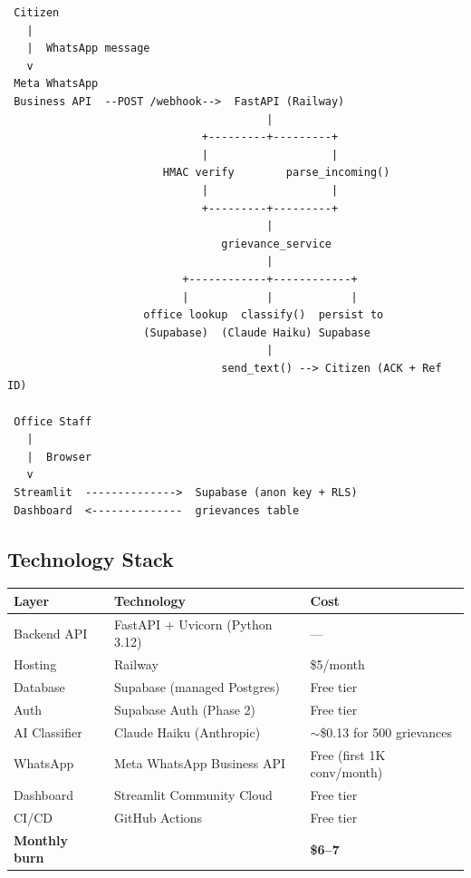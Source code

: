\documentclass[11pt, a4paper]{article}
\begin{document}
\begin{center}
\begin{tcolorbox}[colback=lightgray, colframe=pollityblue, sharp corners, width=\linewidth]
\footnotesize\ttfamily
\begin{verbatim}
 Citizen
   |
   |  WhatsApp message
   v
 Meta WhatsApp
 Business API  --POST /webhook-->  FastAPI (Railway)
                                        |
                              +---------+---------+
                              |                   |
                        HMAC verify        parse_incoming()
                              |                   |
                              +---------+---------+
                                        |
                                 grievance_service
                                        |
                           +------------+------------+
                           |            |            |
                     office lookup  classify()  persist to
                     (Supabase)  (Claude Haiku) Supabase
                                        |
                                 send_text() --> Citizen (ACK + Ref ID)

 Office Staff
   |
   |  Browser
   v
 Streamlit  -------------->  Supabase (anon key + RLS)
 Dashboard  <--------------  grievances table
\end{verbatim}
\end{tcolorbox}
\end{center}

\subsection{Technology Stack}

\renewcommand{\arraystretch}{1.3}
\begin{tabularx}{\linewidth}{lXl}
\toprule
\textbf{Layer} & \textbf{Technology} & \textbf{Cost} \\
\midrule
Backend API      & FastAPI + Uvicorn (Python 3.12) & — \\
Hosting          & Railway                         & \$5/month \\
Database         & Supabase (managed Postgres)     & Free tier \\
Auth             & Supabase Auth (Phase 2)         & Free tier \\
AI Classifier    & Claude Haiku (Anthropic)        & $\sim$\$0.13 for 500 grievances \\
WhatsApp         & Meta WhatsApp Business API      & Free (first 1K conv/month) \\
Dashboard        & Streamlit Community Cloud       & Free tier \\
CI/CD            & GitHub Actions                  & Free tier \\
\midrule
\textbf{Monthly burn} & & \textbf{\$6--7} \\
\bottomrule
\end{tabularx}
\end{document}
